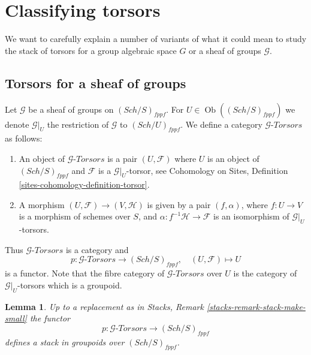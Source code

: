 \documentclass{stacks-project}
\theoremstyle{plain}
\newtheorem{lemma}[subsection]{Lemma}
\theoremstyle{definition}
\theoremstyle{remark}
\numberwithin{equation}{subsection}
\def\Sch{\mathit{Sch}}
\def\Ob{\mathop{\mathrm{Ob}}\nolimits}
\begin{document}
\section{Classifying torsors}
\label{section-torsors}

\noindent
We want to carefully explain a number of variants of what it could
mean to study the stack of torsors for a group algebraic space $G$
or a sheaf of groups $\mathcal{G}$.



\subsection{Torsors for a sheaf of groups}
\label{subsection-torsors-sheaf}

\noindent
Let $\mathcal{G}$ be a sheaf of groups on $(\Sch/S)_{fppf}$.
For $U \in \Ob((\Sch/S)_{fppf})$ we denote
$\mathcal{G}|_U$ the restriction of $\mathcal{G}$ to $(\Sch/U)_{fppf}$.
We define a category $\mathcal{G}\textit{-Torsors}$ as follows:
\begin{enumerate}
\item An object of $\mathcal{G}\textit{-Torsors}$ is a pair
$(U, \mathcal{F})$ where $U$ is an object of $(\Sch/S)_{fppf}$
and $\mathcal{F}$ is a $\mathcal{G}|_U$-torsor, see
Cohomology on Sites, Definition \ref{sites-cohomology-definition-torsor}.
\item A morphism $(U, \mathcal{F}) \to (V, \mathcal{H})$ is given
by a pair $(f, \alpha)$, where $f : U \to V$ is a morphism of schemes
over $S$, and $\alpha : f^{-1}\mathcal{H} \to \mathcal{F}$ is an
isomorphism of $\mathcal{G}|_U$-torsors.
\end{enumerate}
Thus $\mathcal{G}\textit{-Torsors}$ is a category and
$$
p : \mathcal{G}\textit{-Torsors} \longrightarrow (\Sch/S)_{fppf},
\quad
(U, \mathcal{F}) \longmapsto U
$$
is a functor. Note that the fibre category of $\mathcal{G}\textit{-Torsors}$
over $U$ is the category of $\mathcal{G}|_U$-torsors which is a groupoid.

\begin{lemma}
\label{lemma-torsors-sheaf-stack-in-groupoids}
Up to a replacement as in
Stacks, Remark \ref{stacks-remark-stack-make-small}
the functor
$$
p : \mathcal{G}\textit{-Torsors} \longrightarrow (\Sch/S)_{fppf}
$$
defines a stack in groupoids over $(\Sch/S)_{fppf}$.
\end{lemma}
\end{document}

